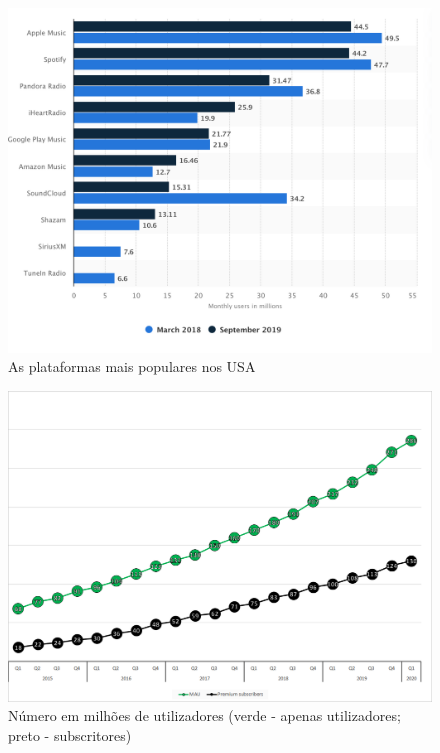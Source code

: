 \documentclass{report}
\begin{document}
\begin{figure}
    \centering
    \includegraphics[scale = 0.4]{Imagens/Most popular music streaming services in the United States in March 2018 and September 2019, by monthly users.png}
    \caption{As plataformas mais populares nos USA} \label{fig4:popularidade}
\end{figure}
%
\begin{figure} 
    \centering
    \includegraphics[scale = 0.25]{Imagens/spotify-mau-vs-subs.png}
    \caption{Número em milhões de utilizadores (verde - apenas utilizadores; preto - subscritores)} 
    \label{fig5:stats}
\end{figure}
%
%
\end{document}
